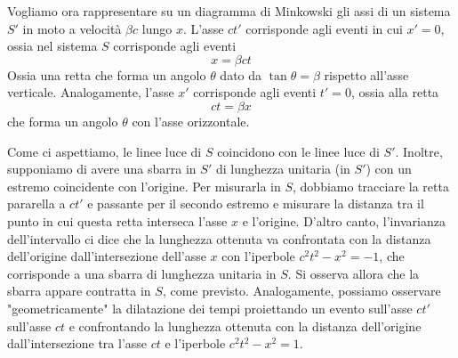 \documentclass[a4paper,11pt]{book}
\theoremstyle{theorem}
\theoremstyle{definition}
\begin{document}
\noindent Vogliamo ora rappresentare su un diagramma di Minkowski gli assi di un sistema $S'$ in moto a velocità $\beta c$ lungo $x$. L'asse $ct'$ corrisponde agli eventi in cui $x'=0$, ossia nel sistema $S$ corrisponde agli eventi
\[x=\beta ct\]
Ossia una retta che forma un angolo $\theta$ dato da $\tan\theta=\beta$ rispetto all'asse verticale. Analogamente, l'asse $x'$ corrisponde agli eventi $t'=0$, ossia alla retta
\[ct=\beta x\]
che forma un angolo $\theta$ con l'asse orizzontale.
\begin{figure}[h]
	\centering
\end{figure}
Come ci aspettiamo, le linee luce di $S$ coincidono con le linee luce di $S'$. Inoltre, supponiamo di avere una sbarra in $S'$ di lunghezza unitaria (in $S'$) con un estremo coincidente con l'origine. Per misurarla in $S$, dobbiamo tracciare la retta pararella a $ct'$ e passante per il secondo estremo e misurare la distanza tra il punto in cui questa retta interseca l'asse $x$ e l'origine. D'altro canto, l'invarianza dell'intervallo ci dice che la lunghezza ottenuta va confrontata con la distanza dell'origine dall'intersezione dell'asse $x$ con l'iperbole $c^2t^2-x^2=-1$, che corrisponde a una sbarra di lunghezza unitaria in $S$. Si osserva allora che la sbarra appare contratta in $S$, come previsto. Analogamente, possiamo osservare "geometricamente" la dilatazione dei tempi proiettando un evento sull'asse $ct'$ sull'asse $ct$ e confrontando la lunghezza ottenuta con la distanza dell'origine dall'intersezione tra l'asse $ct$ e l'iperbole $c^2t^2-x^2=1$.
\begin{figure}[h]
	\centering
\end{figure}
\newpage
\end{document}
